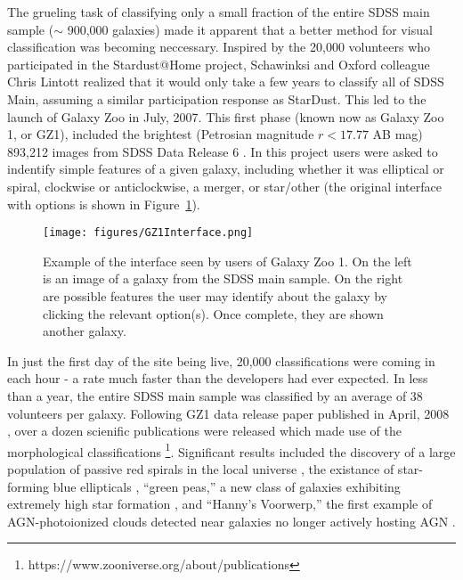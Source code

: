 The grueling task of classifying only a small fraction of the entire SDSS main sample ($\sim$ 900,000 galaxies) made it apparent that a better method for visual classification was becoming neccessary. Inspired by the 20,000 volunteers who participated in the Stardust@Home project, Schawinksi and Oxford colleague Chris Lintott realized that it would only take a few years to classify all of SDSS Main, assuming a similar participation response as StarDust. This led to the launch of Galaxy Zoo in July, 2007. This first phase (known now as Galaxy Zoo 1, or GZ1), included the brightest (Petrosian magnitude $r < 17.77$ AB mag) 893,212 images from SDSS Data Release 6 \citep{Strauss2002,AdelmanMcCarthy2008}. In this project users were asked to indentify simple features of a given galaxy, including whether it was elliptical or spiral, clockwise or anticlockwise, a merger, or star/other (the original interface with options is shown in Figure~\ref{GZ1_Interface}). 

\begin{figure}
\centering
\texttt{[image: figures/GZ1Interface.png]}
\caption{Example of the interface seen by users of Galaxy Zoo 1. On the left is an image of a galaxy from the SDSS main sample. On the right are possible features the user may identify about the galaxy by clicking the relevant option(s). Once complete, they are shown another galaxy.}
\label{GZ1_Interface}
\end{figure}

In just the first day of the site being live, 20,000 classifications were coming in each hour - a rate much faster than the developers had ever expected. In less than a year, the entire SDSS main sample was classified by an average of 38 volunteers per galaxy. Following GZ1 data release paper published in April, 2008 \citep{Lintott2008}, over a dozen scienific publications were released which made use of the morphological classifications \footnote{https://www.zooniverse.org/about/publications}. Significant results included the discovery of a large population of passive red spirals in the local universe \citep{Masters2010}, the existance of star-forming blue ellipticals \citep{Schawinski2009b}, ``green peas,'' a new class of galaxies exhibiting extremely high star formation \citep{Cardamone2009}, and ``Hanny's Voorwerp,'' the first example of AGN-photoionized clouds detected near galaxies no longer actively hosting AGN \citep{Lintott2009}.

